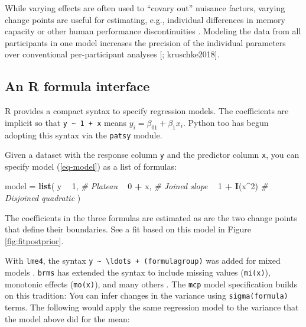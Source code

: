 \documentclass[
  american,
]{article}
\newenvironment{Shaded}{\begin{snugshade}}{\end{snugshade}}
\newcommand{\CommentTok}[1]{\textcolor[rgb]{0.56,0.35,0.01}{\textit{#1}}}
\newcommand{\DecValTok}[1]{\textcolor[rgb]{0.00,0.00,0.81}{#1}}
\newcommand{\KeywordTok}[1]{\textcolor[rgb]{0.13,0.29,0.53}{\textbf{#1}}}
\newcommand{\NormalTok}[1]{#1}
\newcommand{\OperatorTok}[1]{\textcolor[rgb]{0.81,0.36,0.00}{\textbf{#1}}}
\newcommand{\StringTok}[1]{\textcolor[rgb]{0.31,0.60,0.02}{#1}}
\begin{document}
\begin{equation}
[x_i > \delta_{k, j}]
\end{equation}

While varying effects are often used to ``covary out'' nuisance factors, varying change points are useful for estimating, e.g., individual differences in memory capacity or other human performance discontinuities \citep{lindelov2018}. Modeling the data from all participants in one model increases the precision of the individual parameters over conventional per-participant analyses {[}\citet{leibovich-raveh2018}; kruschke2018{]}.

\hypertarget{segments_api}{%
\subsection{An R formula interface}\label{segments_api}}

R \citep{rcoreteam2019} provides a compact syntax to specify regression models. The coefficients are implicit so that \texttt{y\ \textasciitilde{}\ 1\ +\ x} means \(y_i = \beta_01 + \beta_1x_i\). Python too has begun adopting this syntax via the \texttt{patsy} module.

Given a dataset with the response column \texttt{y} and the predictor column \texttt{x}, you can specify model (\ref{eq-model}) as a list of formulas:

\begin{Shaded}
\begin{Highlighting}[]
\NormalTok{model =}\StringTok{ }\KeywordTok{list}\NormalTok{(}
\NormalTok{  y }\OperatorTok{~}\StringTok{ }\DecValTok{1}\NormalTok{,        }\CommentTok{# Plateau}
    \OperatorTok{~}\StringTok{ }\DecValTok{0} \OperatorTok{+}\StringTok{ }\NormalTok{x,      }\CommentTok{# Joined slope}
    \OperatorTok{~}\StringTok{ }\DecValTok{1} \OperatorTok{+}\StringTok{ }\KeywordTok{I}\NormalTok{(x}\OperatorTok{^}\DecValTok{2}\NormalTok{)  }\CommentTok{# Disjoined quadratic}
\NormalTok{)}
\end{Highlighting}
\end{Shaded}

The coefficients in the three formulas are estimated as are the two change points that define their boundaries. See a fit based on this model in Figure \ref{fig:fitpostprior}.

With \texttt{lme4}, the syntax \texttt{y\ \textasciitilde{}\ \textbackslash{}ldots\ +\ (formula\textbar{}group)} was added for mixed models \citep{bates2015}. \texttt{brms} has extended the syntax to include missing values (\texttt{mi(x)}), monotonic effects (\texttt{mo(x)}), and many others \citep{burkner2017}. The \texttt{mcp} model specification builds on this tradition: You can infer changes in the variance using \texttt{sigma(formula)} terms. The following would apply the same regression model to the variance that the model above did for the mean:
\end{document}
